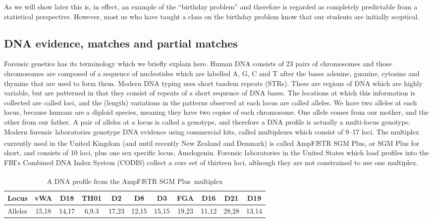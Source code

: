 \documentclass[a4paper,11pt]{article}
\newcommand{\SGMplus}{AmpF\textit{l}STR\textsuperscript{\textregistered}
  SGM Plus\textsuperscript{\texttrademark}}
\begin{document}
As we will show later this is, in effect, an example of the ``birthday
problem'' and therefore is regarded as completely predictable from a
statistical perspective. However, most us who have taught a class on
the birthday problem know that our students are initially sceptical. 

\subsection[Matches and partial matches]{DNA evidence, matches and partial matches}
\label{sec:dna-matches-partial}
Forensic genetics has its terminology which we briefly explain here. 
Human DNA consists of 23 pairs of chromosomes and those
chromosomes are composed of a sequence of nucleotides which are
labelled A, G, C and T after the bases adenine, guanine, cytosine and
thymine that are used to form them. Modern DNA typing uses short
tandem repeats (STRs). These are regions of DNA which are highly
variable, but are patterned in that they consist of repeats of a short
sequence of DNA bases. The locations at which this information is
collected are called loci, and the (length) variations in the patterns
observed at each locus are called alleles. We have two alleles at each
locus, because humans are a diploid species, meaning they have two
copies of each chromosome. One allele comes from our mother, and the
other from our father. A pair of alleles at a locus is called a
genotype, and therefore a DNA profile is actually a multi-locus genotype.
Modern forensic laboratories genotype DNA evidence using commercial kits,
called multiplexes which consist of 9--17 loci. The multiplex currently
used in the United Kingdom (and until recently New Zealand and
Denmark) is called \SGMplus, or SGM Plus for short, and consists of 10 loci, plus one sex
specific locus, Amelogenin. Forensic laboratories in the United States
which load profiles into the FBI's Combined DNA Index System (CODIS) collect a
core set of thirteen loci, although they are not constrained to use
one multiplex.

\begin{table}[h]
  \centering
  \begin{tabular}{l*{10}{c}}
    \toprule
    Locus & vWA & D18 & TH01 & D2 & D8 & D3 & FGA & D16 & D21 & D19 \\
    \midrule
    Alleles & 15,18 & 14,17 &  6,9.3 & 17,23 & 12,15 & 15,15 & 19,23 & 11,12 & 28,28
    & 13,14\\
    \bottomrule
  \end{tabular}
  \caption{A DNA profile from the \SGMplus~multiplex}
  \label{tab:prof}
\end{table}
\end{document}
